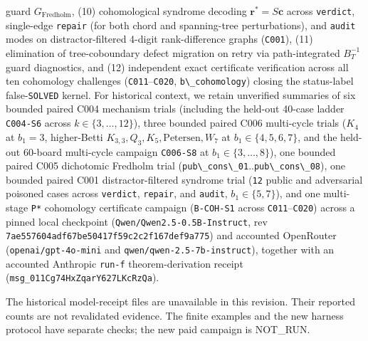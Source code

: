 \documentclass[
  11pt,
]{article}
\newcommand{\passthrough}[1]{#1}
\begin{document}
guard \(G_{\text{Fredholm}}\), (10) cohomological syndrome decoding
\(\mathbf{r}^* = S\mathbf{c}\) across \passthrough{\lstinline!verdict!},
single-edge \passthrough{\lstinline!repair!} (for both chord and
spanning-tree perturbations), and \passthrough{\lstinline!audit!} modes
on distractor-filtered 4-digit rank-difference graphs
(\passthrough{\lstinline!C001!}), (11) elimination of tree-coboundary
defect migration on retry via path-integrated \(B_T^{-1}\) guard
diagnostics, and (12) independent exact certificate verification across
all ten cohomology challenges
(\passthrough{\lstinline!C011!}--\passthrough{\lstinline!C020!},
\passthrough{\lstinline!b\_cohomology!}) closing the status-label
false-\passthrough{\lstinline!SOLVED!} kernel. For historical context,
we retain unverified summaries of six bounded paired C004 mechanism
trials (including the held-out 40-case ladder
\passthrough{\lstinline!C004-S6!} across
\(k \in \{3,\allowbreak  \dots,\allowbreak  12\}\)), three bounded
paired C006 multi-cycle trials (\(K_4\) at \(b_1 = 3\), higher-Betti
\(K_{3,\allowbreak 3},\allowbreak  Q_3,\allowbreak  K_5,\allowbreak  \text{Petersen},\allowbreak  W_7\)
at \(b_1 \in \{4,\allowbreak  5,\allowbreak  6,\allowbreak  7\}\), and
the held-out 60-board multi-cycle campaign
\passthrough{\lstinline!C006-S8!} at
\(b_1 \in \{3,\allowbreak  \dots,\allowbreak  8\}\)), one bounded paired
C005 dichotomic Fredholm trial
(\passthrough{\lstinline!pub\_cons\_01!}..\passthrough{\lstinline!pub\_cons\_08!}),
one bounded paired C001 distractor-filtered syndrome trial
(\passthrough{\lstinline!12!} public and adversarial poisoned cases
across \passthrough{\lstinline!verdict!},
\passthrough{\lstinline!repair!}, and \passthrough{\lstinline!audit!},
\(b_1 \in \{5,\allowbreak  7\}\)), and one multi-stage
\passthrough{\lstinline!P*!} cohomology certificate campaign
(\passthrough{\lstinline!B-COH-S1!} across
\passthrough{\lstinline!C011!}--\passthrough{\lstinline!C020!}) across a
pinned local checkpoint (\nolinkurl{Qwen/Qwen2.5-0.5B-Instruct}, rev
\nolinkurl{7ae557604adf67be50417f59c2c2f167def9a775}) and accounted
OpenRouter (\nolinkurl{openai/gpt-4o-mini} and
\nolinkurl{qwen/qwen-2.5-7b-instruct}), together with an accounted
Anthropic \nolinkurl{run-f} theorem-derivation receipt
(\nolinkurl{msg_011Cg74HxZqarY627LKcRzQa}).

The historical model-receipt files are unavailable in this revision.
Their reported counts are not revalidated evidence. The finite examples
and the new harness protocol have separate checks; the new paid campaign
is NOT\_RUN.
\end{document}
